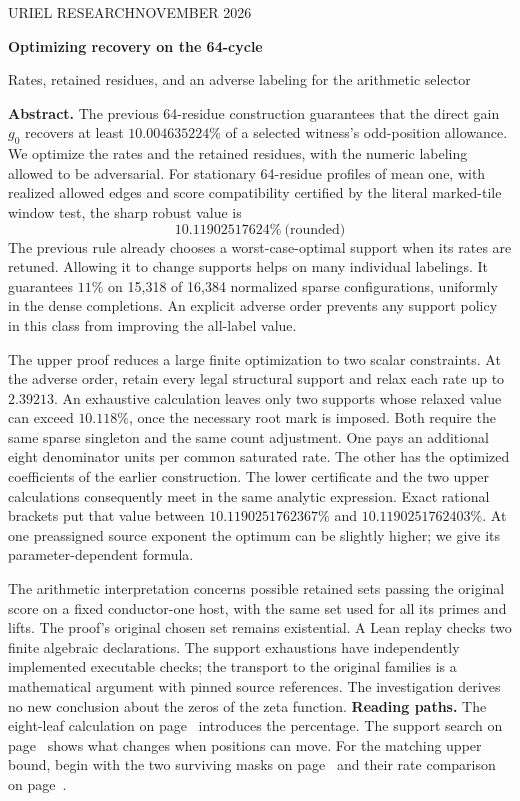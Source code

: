 \documentclass[12pt,letterpaper]{article}
\begin{document}
\thispagestyle{plain}
{\sffamily\small\color{accent}URIEL RESEARCH\hfill NOVEMBER 2026}\par\vspace{10pt}
{\Huge\bfseries\color{ink}Optimizing recovery on the 64-cycle\par}\vspace{6pt}
{\Large\color{muted}Rates, retained residues, and an adverse labeling for the arithmetic selector\par}\medskip
\textbf{Abstract.} The previous 64-residue construction guarantees that the direct gain \(g_0\) recovers at least \(10.004635224\%\) of a selected witness's odd-position allowance. We optimize the rates and the retained residues, with the numeric labeling allowed to be adversarial. For stationary 64-residue profiles of mean one, with realized allowed edges and score compatibility certified by the literal marked-tile window test, the sharp robust value is
\[
                \boxed{10.11902517624\%\ \text{(rounded)}}
\]
The previous rule already chooses a worst-case-optimal support when its rates are retuned. Allowing it to change supports helps on many individual labelings. It guarantees \(11\%\) on 15,318 of 16,384 normalized sparse configurations, uniformly in the dense completions. An explicit adverse order prevents any support policy in this class from improving the all-label value.

The upper proof reduces a large finite optimization to two scalar constraints. At the adverse order, retain every legal structural support and relax each rate up to \(2.39213\). An exhaustive calculation leaves only two supports whose relaxed value can exceed \(10.118\%\), once the necessary root mark is imposed. Both require the same sparse singleton and the same count adjustment. One pays an additional eight denominator units per common saturated rate. The other has the optimized coefficients of the earlier construction. The lower certificate and the two upper calculations consequently meet in the same analytic expression. Exact rational brackets put that value between \(10.1190251762367\%\) and \(10.1190251762403\%\). At one preassigned source exponent the optimum can be slightly higher; we give its parameter-dependent formula.

The arithmetic interpretation concerns possible retained sets passing the original score on a fixed conductor-one host, with the same set used for all its primes and lifts. The proof's original chosen set remains existential. A Lean replay checks two finite algebraic declarations. The support exhaustions have independently implemented executable checks; the transport to the original families is a mathematical argument with pinned source references. The investigation derives no new conclusion about the zeros of the zeta function.
{}
\medskip
\textbf{Reading paths.} The eight-leaf calculation on page~\pageref{sec:ledger} introduces the percentage. The support search on page~\pageref{sec:lower-support} shows what changes when positions can move. For the matching upper bound, begin with the two surviving masks on page~\pageref{sec:two-support-census} and their rate comparison on page~\pageref{sec:cycle64-endgame}.
\clearpage
\tableofcontents
\end{document}
